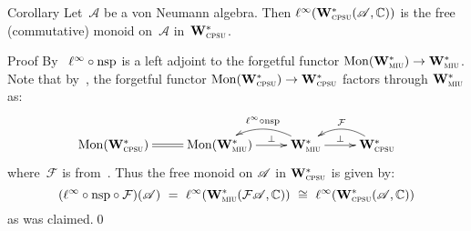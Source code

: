 \documentclass[a]{subfiles}
\begin{document}
\begin{parsec}
\begin{point}{Corollary}
Let~$\mathscr{A}$
be a von Neumann algebra.
Then $\ell^\infty(\mathbf{W}^*_{\text{\textsc{cpsu}}}(\mathscr{A},\mathbb{C}))$
is the free (commutative) monoid
on~$\mathscr{A}$ in~$\mathbf{W}^*_{\text{\textsc{cpsu}}}$.
\begin{point}{Proof}
By~
$\ell^\infty\circ\mathrm{nsp}$ is a left adjoint to
the forgetful functor $\mathrm{Mon}(\mathbf{W}^*_{\text{\textsc{miu}}})\to\mathbf{W}^*_{\text{\textsc{miu}}}$.
Note that
by~,
the forgetful functor $\mathrm{Mon}(\mathbf{W}^*_{\text{\textsc{cpsu}}})\to\mathbf{W}^*_{\text{\textsc{cpsu}}}$
factors through $\mathbf{W}^*_{\text{\textsc{miu}}}$ as:
\[
\xymatrix{
\Mon(\W{cpsu})
\ar@{=}[r]
&
\Mon(\W{miu})
\ar[r]^-{\bot}&
\ar@/_3ex/[l]_{\linf\circ\nsp}
\W{miu}
\ar@{->}[r]^-{\bot}&
\ar@/_3ex/[l]_{\mathcal{F}}
\W{cpsu}
}
\]
where~$\mathcal{F}$ is from~.
Thus the free monoid on $\mathscr{A}$ in $\mathbf{W}^*_{\text{\textsc{cpsu}}}$ is given by:
\[
(\linf\circ\nsp\circ\mathcal{F})(\scrA)
\ =\ 
\linf(\W{miu}(\mathcal{F}\scrA,\C))
\ \cong\ 
\linf(\W{cpsu}(\scrA,\C))
\]
as was claimed.\qed
\end{point}
\end{point}
\end{parsec}
\end{document}
